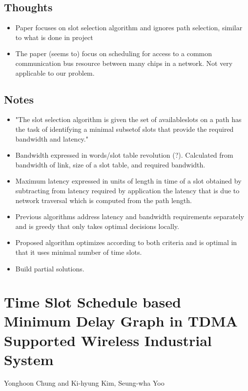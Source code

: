 \documentclass{article}
\begin{document}
\subsection{Thoughts}
\begin{itemize}
    \item Paper focuses on slot selection algorithm and ignores path selection, similar to what is done in project
    \item The paper (seems to) focus on scheduling for access to a common communication bus resource between many chips in a network. Not very applicable to our problem.
\end{itemize}

\subsection{Notes}
\begin{itemize}
    \item "The slot selection algorithm is given the set of availableslots on a path has the task of identifying a minimal subsetof slots that provide the required bandwidth and latency."
    \item Bandwidth expressed in words/slot table revolution (?).  Calculated from bandwidth of link, size of a slot table, and required bandwidth.
    \item Maximum latency expressed in units of length in time of a slot obtained by subtracting from latency required by application the latency that is due to network traversal which is computed from the path length.
    \item Previous algorithms address latency and bandwidth requirements separately and is greedy that only takes optimal decisions locally.
    \item Proposed algorithm optimizes according to both criteria and is optimal in that it uses minimal number of time slots.
    \item Build partial solutions.
\end{itemize}

\section{Time Slot Schedule based Minimum Delay Graph in TDMA Supported Wireless Industrial System}
Yonghoon Chung and Ki-hyung Kim, Seung-wha Yoo
\end{document}
